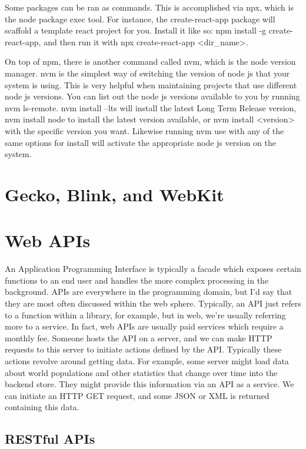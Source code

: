 \documentclass{article}
\begin{document}
Some packages can be ran as commands. This is accomplished via npx, which is the node package exec tool. For
instance, the create-react-app package will scaffold a template react project for you. Install it like so:
npm install -g create-react-app, and then run it with npx create-react-app <dir\_name>.

On top of npm, there is another command called nvm, which is the node version manager. nvm is the simplest
way of switching the version of node js that your system is using. This is very helpful when maintaining
projects that use different node js versions. You can list out the node js versions available to you by
running nvm ls-remote. nvm install --lts will install the latest Long Term Release version, nvm install node
to install the latest version available, or nvm install <version> with the specific version you want. Likewise
running nvm use with any of the same options for install will activate the appropriate node js version on the
system.

\section{Gecko, Blink, and WebKit}

\section{Web APIs}

An Application Programming Interface is typically a facade which exposes certain functions to an end user and
handles the more complex processing in the background. APIs are everywhere in the programming domain, but I'd
say that they are most often discussed within the web sphere. Typically, an API just refers to a function
within a library, for example, but in web, we're usually referring more to a service. In fact, web APIs are
usually paid services which require a monthly fee. Someone hosts the API on a server, and we can make HTTP
requests to this server to initiate actions defined by the API. Typically these actions revolve around getting
data. For example, some server might load data about world populations and other statistics that change over
time into the backend store. They might provide this information via an API as a service. We can initiate an
HTTP GET request, and some JSON or XML is returned containing this data.

\subsection{RESTful APIs}
\end{document}
